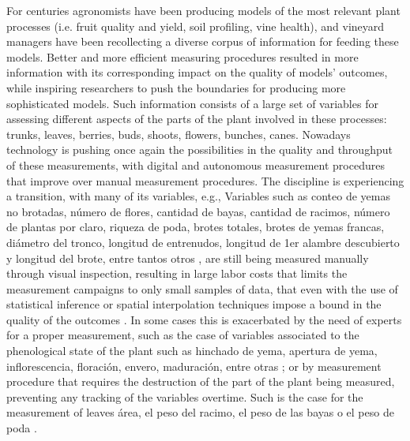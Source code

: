 \documentclass[a4paper,authoryear,review]{elsarticle}
\begin{document}
%
For centuries agronomists have been producing models of the most relevant plant processes (i.e. fruit quality and yield, soil profiling, vine health),  and vineyard managers have been recollecting a diverse corpus of information for feeding these models.  Better and more efficient measuring procedures resulted in more information with its corresponding impact on the quality of models’ outcomes, while inspiring researchers to push the boundaries for producing more sophisticated models. Such information consists of a large set of variables for assessing different aspects of the parts of the plant involved in these processes: trunks, leaves, berries, buds, shoots, flowers, bunches, canes. 
%
Nowadays technology is pushing once again the possibilities in the quality and throughput of these measurements, with digital and autonomous measurement procedures that improve over manual measurement procedures. The discipline is experiencing a transition, with many of its variables, e.g.,  
Variables such as conteo de yemas no brotadas, número de flores, cantidad de bayas, cantidad de racimos, número de plantas por claro, riqueza de poda, brotes totales, brotes de yemas francas, diámetro del tronco, longitud de entrenudos, longitud de 1er alambre descubierto y longitud del brote, entre tantos otros  \citep{pellegrino2005towards, intrigliolo2007evaluation, reynolds2009influence}, \citep{matese2015technology, ozdemir2017precision, poni2018grapevine} are still being measured manually through visual inspection, resulting in large labor costs that limits the measurement campaigns to only small samples of data, that even with the use of statistical inference or spatial interpolation techniques impose a bound in the quality of the outcomes \citep{whelan1996spatial, borgogno2018comparison, taylor2019considerations}. 
%
In some cases this is exacerbated by the need of experts for a proper measurement, such as the case of variables associated to the phenological state of the plant such as hinchado de yema, apertura de yema, inflorescencia, floración, envero, maduración, entre otras \citep{lorenz1995growth, zapata2017predicting}; or by measurement procedure that requires the destruction of the part of the plant being measured, preventing any tracking of the variables overtime. Such is the case for the measurement of leaves área, el peso del racimo, el peso de las bayas o el peso de poda \citep{kliewer2005leaf, diago2012grapevine, liu2013towards}. 
%
%
\end{document}
